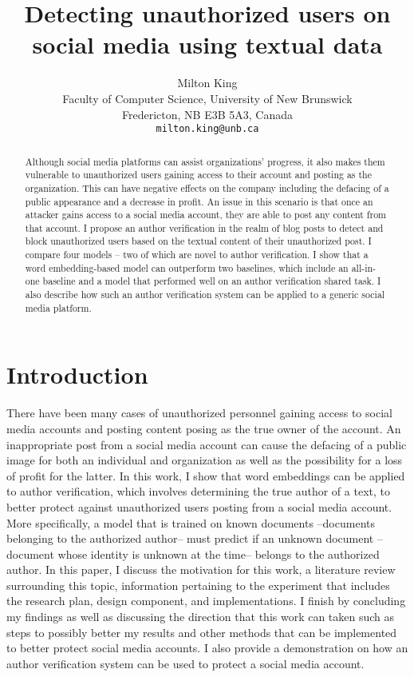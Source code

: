 \documentclass[11pt]{article}
\title{Detecting unauthorized users on social media using textual data}
\author{Milton King  \\
Faculty of Computer Science, University of New Brunswick\\
Fredericton, NB E3B 5A3, Canada\\
\tt{milton.king@unb.ca}}
\begin{document}
\maketitle

\begin{abstract}
Although social media platforms can assist organizations' progress, it also makes them vulnerable to unauthorized users gaining access to their account and posting as the organization. This can have negative effects on the company including the defacing of a public appearance and a decrease in profit. An issue in this scenario is that once an attacker gains access to a social media account, they are able to post any content from that account. I propose an author verification in the realm of blog posts to detect and block unauthorized users based on the textual content of their unauthorized post. I compare four models -- two of which are novel to author verification. I show that a word embedding-based model can outperform two baselines, which include an all-in-one baseline and a model that performed well on an author verification shared task. I also describe how such an author verification system can be applied to a generic social media platform.

\end{abstract}

\section{Introduction}
There have been many cases of unauthorized personnel gaining access to social media accounts and posting content posing as the true owner of the account. An inappropriate post from a social media account can cause the defacing of a public image for both an individual and organization as well as the possibility for a loss of profit for the latter. In this work, I show that word embeddings can be applied to author verification, which involves determining the true author of a text, to better protect against unauthorized users posting from a social media account. More specifically, a model that is trained on known documents --documents belonging to the authorized author-- must predict if an unknown document --document whose identity is unknown at the time-- belongs to the authorized author. In this paper, I discuss the motivation for this work, a literature review surrounding this topic, information pertaining to the experiment that includes the research plan, design component, and implementations. I finish by concluding my findings as well as discussing the direction that this work can taken such as steps to possibly better my results and other methods that can be implemented to better protect social media accounts. I also provide a demonstration on how an author verification system can be used to protect a social media account.
\end{document}
